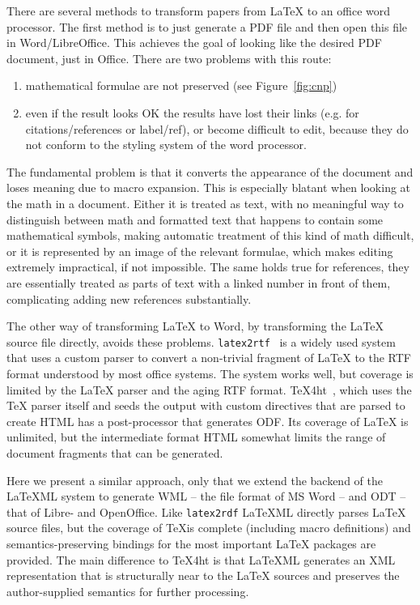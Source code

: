 \documentclass{llncs}
\def\latexml{{\LaTeX}ML\xspace}
\begin{document}
There are several methods to transform papers from {\LaTeX} to an office word
processor. The first method is to just generate a PDF file and then open this file in
Word/LibreOffice. This achieves the goal of looking like the desired PDF document, just in
Office. There are two problems with this route: 
\begin{enumerate}
\item mathematical formulae are not preserved (see Figure~\ref{fig:cnp})
\item even if the result looks OK the results have lost their links (e.g. for
  citations/references or label/ref), or become difficult to edit, because they do not
  conform to the styling system of the word processor.
\end{enumerate}
The fundamental problem is that it converts the appearance of the document and loses
meaning due to macro expansion. This is especially blatant when looking at the math in a
document. Either it is treated as text, with no meaningful way to distinguish between math
and formatted text that happens to contain some mathematical symbols, making automatic
treatment of this kind of math difficult, or it is represented by an image of the relevant
formulae, which makes editing extremely impractical, if not impossible. The same holds true
for references, they are essentially treated as parts of text with a linked number in
front of them, complicating adding new references substantially.

The other way of transforming {\LaTeX} to Word, by transforming the {\LaTeX} source file
directly, avoids these problems. \texttt{latex2rtf}~\cite{latex2rtf:on} is a widely used
system that uses a custom parser to convert a non-trivial fragment of {\LaTeX} to the RTF
format understood by most office systems. The system works well, but coverage is limited
by the {\LaTeX} parser and the aging RTF format.  TeX4ht~\cite{tex4ht:online}, which uses
the {\TeX} parser itself and seeds the output with custom directives that are parsed to
create HTML has a post-processor that generates ODF. Its coverage of {\LaTeX} is unlimited,
but the intermediate format HTML somewhat limits the range of document fragments that can
be generated. 

Here we present a similar approach, only that we extend the backend of the \latexml system
to generate WML -- the file format of MS Word -- and ODT -- that of Libre- and
OpenOffice. Like \texttt{latex2rdf} \latexml directly parses {\LaTeX} source files, but
the coverage of \TeX is complete (including macro definitions) and semantics-preserving
bindings for the most important {\LaTeX} packages are provided. The main difference to
TeX4ht is that \latexml generates an XML representation that is structurally near to the
{\LaTeX} sources and preserves the author-supplied semantics for further processing.
\end{document}
